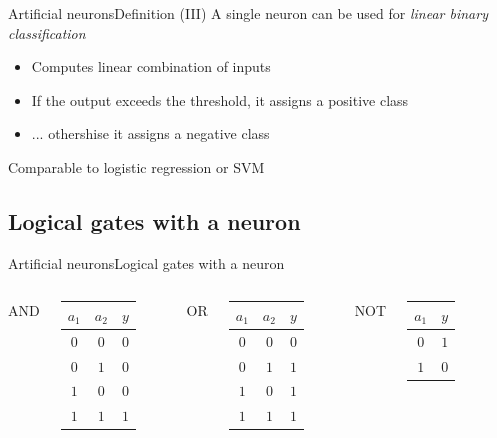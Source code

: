 \documentclass[10pt,compress]{beamer} %
\begin{document}
\begin{frame}{Artificial neurons}{Definition (III)}
	A single neuron can be used for \textit{linear binary classification}
	\begin{itemize}
	\item Computes linear combination of inputs
	\item If the output exceeds the threshold, it assigns a positive class
	\item ... othershise it assigns a negative class
	\end{itemize}

	Comparable to logistic regression or SVM
\end{frame}


\subsection{Logical gates with a neuron}
\begin{frame}{Artificial neurons}{Logical gates with a neuron}
    \begin{columns}
	   		\centering AND\\
            

			 \begin{tabular}{ccc}\hline
			 $a_1$ & $a_2$ & $y$ \\\hline
			 $0$ & $0$ & $0$ \\
			 $0$ & $1$ & $0$ \\
			 $1$ & $0$ & $0$ \\
			 $1$ & $1$ & $1$ \\
			 \end{tabular}
	   		\centering OR\\
            

			 \begin{tabular}{ccc}\hline
			 $a_1$ & $a_2$ & $y$ \\\hline
			 $0$ & $0$ & $0$ \\
			 $0$ & $1$ & $1$ \\
			 $1$ & $0$ & $1$ \\
			 $1$ & $1$ & $1$ \\
			 \end{tabular}
	   		\centering NOT\\\bigskip
            
			\vspace{1cm}
			 \begin{tabular}{cc}\hline
			 $a_1$ & $y$ \\\hline
			 $0$ & $1$ \\
			 $1$ & $0$ \\
			 \end{tabular}
    \end{columns}
\end{frame}
\end{document}
